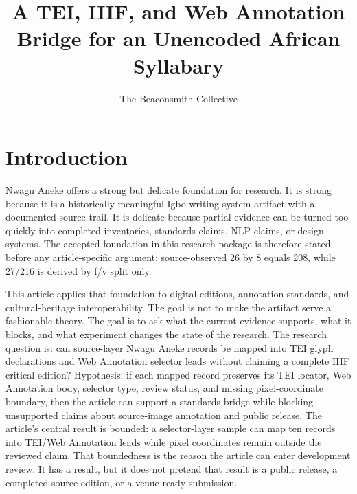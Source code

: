\documentclass[sigconf,nonacm]{acmart}
\title{A TEI, IIIF, and Web Annotation Bridge for an Unencoded African Syllabary}
\author{The Beaconsmith Collective}
\affiliation{\institution{Etisiobi Research Studio}\city{Enugu}\country{Nigeria}}
\begin{document}
\maketitle

\section{Introduction}
Nwagu Aneke offers a strong but delicate foundation for research. It is strong
because it is a historically meaningful Igbo writing-system artifact with a
documented source trail. It is delicate because partial evidence can be turned
too quickly into completed inventories, standards claims, NLP claims, or design
systems. The accepted foundation in this research package is therefore stated
before any article-specific argument: source-observed 26 by 8 equals 208, while
27/216 is derived by f/v split only.

This article applies that foundation to digital editions, annotation standards, and cultural-heritage interoperability. The goal is not to make the
artifact serve a fashionable theory. The goal is to ask what the current
evidence supports, what it blocks, and what experiment changes the state of the
research. The research question is: can source-layer Nwagu Aneke records be
mapped into TEI glyph declarations and Web Annotation selector leads without
claiming a complete IIIF critical edition? Hypothesis: if each mapped record
preserves its TEI locator, Web Annotation body, selector type, review status,
and missing pixel-coordinate boundary, then the article can support a standards
bridge while blocking unsupported claims about source-image annotation and
public release. The article's central result is bounded: a selector-layer sample
can map ten records into TEI/Web Annotation leads while pixel coordinates remain
outside the reviewed claim. That boundedness is the reason the article can enter
development review. It has a result, but it does not pretend that result is a
public release, a completed source edition, or a venue-ready submission.
\end{document}

